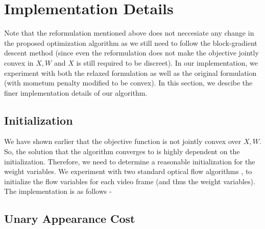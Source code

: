 \section{Implementation Details}

Note that the reformulation mentioned above does not neccesiate any
change in the proposed optimization algorithm as we still need to
follow the block-gradient descent method (since even the reformulation
does not make the objective jointly convex in $X,W$ and $X$ is still
required to be discreet). In our implementation, we experiment with both the relaxed formulation as well as the original formulation (with mometum penalty modified to be convex). In this section, we descibe the finer implementation details of our algorithm.


\subsection{Initialization}

We have shown earlier that the objective function is not jointly convex
over $X,W$. So, the solution that the algorithm converges to is highly
dependent on the initialization. Therefore, we need to determine a
reasonable initialization for the weight variables. We experiment
with two standard optical flow algorithms \cite{HornSchunk}, \cite{LukasKanade} to
initialize the flow variables for each video frame (and thus the weight
variables). The implementation is as follows -

\begin{algorithm}[H]
\caption{$generatePriors(I)$}
\end{algorithm}



\subsection{Unary Appearance Cost}

